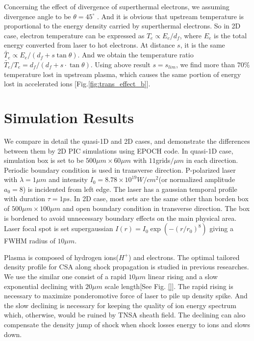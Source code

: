 \documentclass[12pt]{iopart}
\begin{document}
Concerning the effect of divergence of superthermal electrons, we assuming divergence angle to be $\theta=45^\circ$  \cite{gibbon_short_2005}. And it is obvious that upstream temperature is proportional to the energy density carried by superthermal electrons. So in 2D case, electron temperature can be expressed as $T_e\propto E_e/d_f$, where $E_e$ is the total energy converted from laser to hot electrons. At distance $s$, it is the same $\tilde{T_e} \propto E_e/(d_f+s\tan{\theta})$. And we obtain the temperature ratio $\tilde{T_e}/T_e=d_f/(d_f+s\cdot\tan{\theta})$. Using above result $s=s_{lim}$, we find more than $70\%$ temperature lost in upstream plasma, which causes the same portion of energy lost in accelerated ions [Fig.\ref{fig:trans_effect_b}].

\section{Simulation Results}
\label{simulation}
We compare in detail the quasi-1D and 2D cases, and demonstrate the differences between them by 2D PIC simulations using EPOCH code\cite{}. In quasi-1D case, simulation box is set to be $500\mu m \times 60\mu m$ with $11$grids$/\mu m$ in each direction. Periodic boundary condition is used in transverse direction. P-polarized laser with $\lambda=1\mu m$ and intensity $I_0=8.78\times 10^{19}W/cm^2$(or normalized amplitude $a_0 = 8$) is incidented from left edge. The laser has a gaussian temporal profile with duration $\tau=1ps$. In 2D case, most sets are the same other than borden box of $500\mu m \times 100\mu m$ and open boundary condition in transverse direction. The box is bordened to avoid unnecessary boundary effects on the main physical area. Laser focal spot is set supergaussian $I(r)=I_0\exp(-(r/r_0)^8)$ giving a FWHM radius of $10\mu m$.

Plasma is composed of hydrogen ions($H^+$) and electrons. The optimal tailored density profile for CSA along shock propagation is studied in previous researches\cite{fiuza_ion_2013,fiuza_laser-driven_2012,boella_numerical_2017}. We use the similar one consist of a rapid $10\mu m$ linear rising and a slow exponential declining with $20\mu m$ scale length[See Fig. \ref{}]. The rapid rising is necessary to maximize ponderomotive force of laser to pile up density spike. And the slow declining is necessary for keeping the quality of ion energy spectrum which, otherwise, would be ruined by TNSA sheath field. The declining can also compensate the density jump  of shock when shock losses energy to ions and slows down\cite{macchi_solitary_2012}. 
\end{document}
